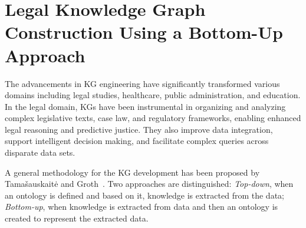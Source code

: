 \documentclass[runningheads]{llncs}
\begin{document}
\section{Legal Knowledge Graph Construction Using a Bottom-Up Approach}\label{approach-bottomUp}
The advancements in KG engineering have significantly transformed various domains including legal studies, healthcare, public administration, and education. 
In the legal domain, KGs have been instrumental in organizing and analyzing complex legislative texts, case law, and regulatory frameworks, enabling enhanced legal reasoning and predictive justice. 
They also improve data integration, support intelligent decision making, and facilitate complex queries across disparate data sets. 

A general methodology for the KG development %
has been proposed by Tamašauskaitė and Groth~\cite{Tamaauskaite2022}.
Two %
approaches are distinguished: %
\textit{Top-down}, when an ontology is defined and based on it, knowledge is extracted from the data; \textit{Bottom-up}, when knowledge is extracted from data and then an ontology is created to represent the extracted data. 
\end{document}
